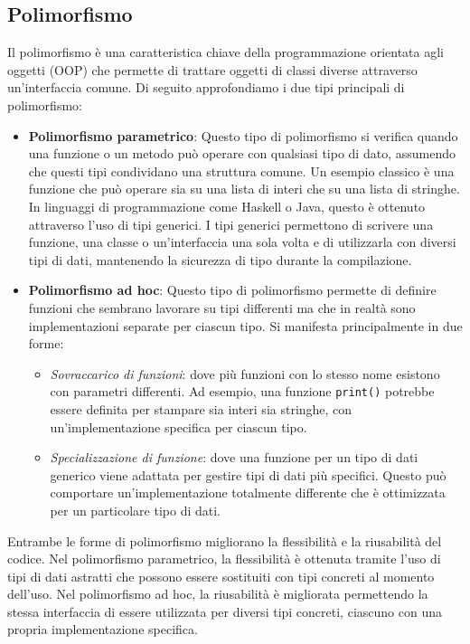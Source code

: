 \documentclass{article}
\begin{document}
	\subsection{Polimorfismo}
	Il polimorfismo è una caratteristica chiave della programmazione orientata agli oggetti (OOP) che permette di trattare oggetti di classi diverse attraverso un'interfaccia comune. Di seguito approfondiamo i due tipi principali di polimorfismo:
	\begin{itemize}
		\item \textbf{Polimorfismo parametrico}: Questo tipo di polimorfismo si verifica quando una funzione o un metodo può operare con qualsiasi tipo di dato, assumendo che questi tipi condividano una struttura comune. Un esempio classico è una funzione che può operare sia su una lista di interi che su una lista di stringhe. In linguaggi di programmazione come Haskell o Java, questo è ottenuto attraverso l'uso di tipi generici. I tipi generici permettono di scrivere una funzione, una classe o un'interfaccia una sola volta e di utilizzarla con diversi tipi di dati, mantenendo la sicurezza di tipo durante la compilazione.
		\item \textbf{Polimorfismo ad hoc}: Questo tipo di polimorfismo permette di definire funzioni che sembrano lavorare su tipi differenti ma che in realtà sono implementazioni separate per ciascun tipo. Si manifesta principalmente in due forme:
		\begin{itemize}
			\item \textit{Sovraccarico di funzioni}: dove più funzioni con lo stesso nome esistono con parametri differenti. Ad esempio, una funzione \texttt{print()} potrebbe essere definita per stampare sia interi sia stringhe, con un'implementazione specifica per ciascun tipo.
			\item \textit{Specializzazione di funzione}: dove una funzione per un tipo di dati generico viene adattata per gestire tipi di dati più specifici. Questo può comportare un'implementazione totalmente differente che è ottimizzata per un particolare tipo di dati.
		\end{itemize}
	\end{itemize}
	Entrambe le forme di polimorfismo migliorano la flessibilità e la riusabilità del codice. Nel polimorfismo parametrico, la flessibilità è ottenuta tramite l'uso di tipi di dati astratti che possono essere sostituiti con tipi concreti al momento dell'uso. Nel polimorfismo ad hoc, la riusabilità è migliorata permettendo la stessa interfaccia di essere utilizzata per diversi tipi concreti, ciascuno con una propria implementazione specifica.
\end{document}
